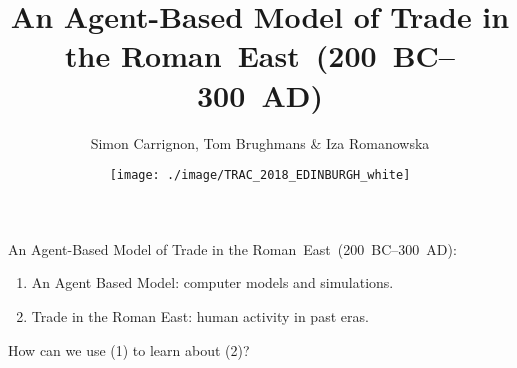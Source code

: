 \documentclass[10pt, notes=show]{beamer}
\title{
    An Agent-Based Model of Trade in the Roman~East~(200~BC--300~AD)
}
\institute{12 April 2018}
\date{\texttt{[image: ./image/TRAC\_2018\_EDINBURGH\_white]}}
\author{Simon Carrignon, Tom Brughmans \& Iza Romanowska}
\begin{document}
\begin{frame}
    \maketitle
\end{frame}
\begin{frame}{}
    An Agent-Based Model of Trade in the Roman~East~(200~BC--300~AD):
    \begin{center}
        \parbox{.6\textwidth}{
            \begin{enumerate}
                \item An Agent Based Model: computer models and simulations.
                \item Trade in the Roman East: human activity in past eras. 
            \end{enumerate}
        }
    \end{center}
    How can we use (\textcolor{tracblue}{1}) to learn about (\textcolor{tracblue}{2})?
    \vfill

\end{frame}
\end{document}
